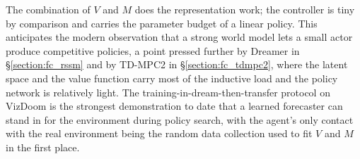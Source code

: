 The combination of $V$ and $M$ does the representation work; the controller is tiny by comparison and carries the parameter budget of a linear policy. This anticipates the modern observation that a strong world model lets a small actor produce competitive policies, a point pressed further by Dreamer in \S\ref{section:fc_rssm} and by TD-MPC2 in \S\ref{section:fc_tdmpc2}, where the latent space and the value function carry most of the inductive load and the policy network is relatively light. The training-in-dream-then-transfer protocol on VizDoom is the strongest demonstration to date that a learned forecaster can stand in for the environment during policy search, with the agent's only contact with the real environment being the random data collection used to fit $V$ and $M$ in the first place.
